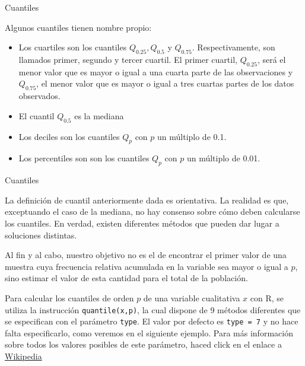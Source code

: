 \documentclass[
  ignorenonframetext,
]{beamer}
\providecommand{\tightlist}{%
  \setlength{\itemsep}{0pt}\setlength{\parskip}{0pt}}
\begin{document}
\begin{frame}{Cuantiles}
\protect\hypertarget{cuantiles}{}

Algunos cuantiles tienen nombre propio:

\begin{itemize}
\tightlist
\item
  Los cuartiles son los cuantiles \(Q_{0.25},Q_{0.5}\) y \(Q_{0.75}\).
  Respectivamente, son llamados primer, segundo y tercer cuartil. El
  primer cuartil, \(Q_{0.25}\), será el menor valor que es mayor o igual
  a una cuarta parte de las observaciones y \(Q_{0.75}\), el menor valor
  que es mayor o igual a tres cuartas partes de los datos observados.
\item
  El cuantil \(Q_{0.5}\) es la mediana
\item
  Los deciles son los cuantiles \(Q_p\) con \(p\) un múltiplo de 0.1.
\item
  Los percentiles son son los cuantiles \(Q_p\) con \(p\) un múltiplo de
  0.01.
\end{itemize}

\end{frame}

\begin{frame}[fragile]{Cuantiles}
\protect\hypertarget{cuantiles-1}{}

La definición de cuantil anteriormente dada es orientativa. La realidad
es que, exceptuando el caso de la mediana, no hay consenso sobre cómo
deben calcularse los cuantiles. En verdad, existen diferentes métodos
que pueden dar lugar a soluciones distintas.

Al fin y al cabo, nuestro objetivo no es el de encontrar el primer valor
de una muestra cuya frecuencia relativa acumulada en la variable sea
mayor o igual a \(p\), sino estimar el valor de esta cantidad para el
total de la población.

Para calcular los cuantiles de orden \(p\) de una variable cualitativa
\(x\) con R, se utiliza la instrucción \texttt{quantile(x,p)}, la cual
dispone de 9 métodos diferentes que se especifican con el parámetro
\texttt{type}. El valor por defecto es \texttt{type\ =\ 7} y no hace
falta especificarlo, como veremos en el siguiente ejemplo. Para más
información sobre todos los valores posibles de este parámetro, haced
click en el enlace a
\href{https://es.wikipedia.org/wiki/Cuantil}{Wikipedia}

\end{frame}
\end{document}

